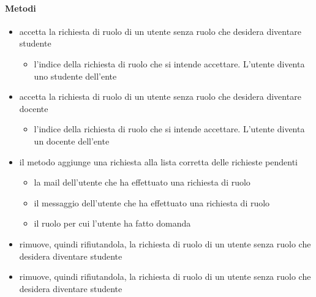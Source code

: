 \paragraph{Metodi}
\begin{itemize}
\item {}
\newline
accetta la richiesta di ruolo di un utente senza ruolo che desidera diventare studente
\newline
{}
\newline
\begin{itemize}
\item {}
\newline
l'indice della richiesta di ruolo che si intende accettare. L'utente diventa uno studente dell'ente
\end{itemize}
\item {}
\newline
accetta la richiesta di ruolo di un utente senza ruolo che desidera diventare docente
\newline
{}
\newline
\begin{itemize}
\item {}
\newline
l'indice della richiesta di ruolo che si intende accettare. L'utente diventa un docente dell'ente
\end{itemize}
\item {}
\newline
il metodo aggiunge una richiesta alla lista corretta delle richieste pendenti
\newline
{}
\newline
\begin{itemize}
\item {}
\newline
la mail dell'utente che ha effettuato una richiesta di ruolo
\item {}
\newline
il messaggio dell'utente che ha effettuato una richiesta di ruolo
\item {}
\newline
il ruolo per cui l'utente ha fatto domanda
\end{itemize}
\item {}
\newline
rimuove, quindi rifiutandola, la richiesta di ruolo di un utente senza ruolo che desidera diventare studente
\newline
\item {}
\newline
rimuove, quindi rifiutandola, la richiesta di ruolo di un utente senza ruolo che desidera diventare studente
\newline
\end{itemize}
